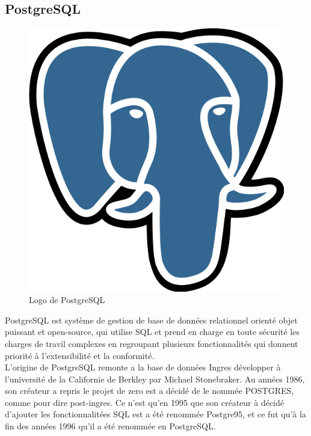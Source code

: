     \subsection{PostgreSQL\cite{postgres}}
    \begin{figure}[H]
        \centering
        \includegraphics[scale=0.2]{ACR/postgresql.png}
        \caption{Logo de PostgreSQL}
    \end{figure}
    
    PostgreSQL est système de gestion de base de données relationnel orienté objet puissant et open-source, qui utilise SQL et prend en charge en toute sécurité les charges de travil complexes en regroupant plusieurs fonctionnalités qui donnent priorité à l'extensibilité et la conformité.\\

    L'origine de PostgreSQL remonte a la base de données Ingres développer à l'université de la Californie de Berkley par Michael Stonebraker. Au années 1986, son créateur a repris le projet de zero est a décidé de le nommée POSTGRES, comme pour dire post-ingres. Ce n'est qu'en 1995 que son créateur à décidé d'ajouter les fonctionnalitées SQL est a été renommée Postgre95, et ce fut qu'à la fin des années 1996 qu'il a été renommée en PostgreSQL.\\
    

